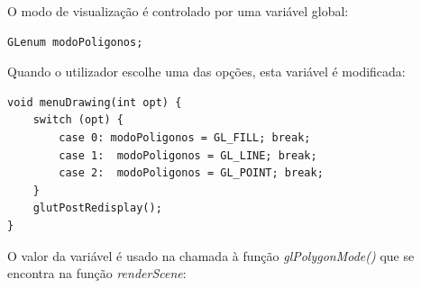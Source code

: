 O modo de visualização é controlado por uma variável global:

\begin{Verbatim}
GLenum modoPoligonos;
\end{Verbatim}

Quando o utilizador escolhe uma das opções, esta variável é modificada:

\begin{Verbatim}
void menuDrawing(int opt) {
	switch (opt) {
		case 0: modoPoligonos = GL_FILL; break;
		case 1:  modoPoligonos = GL_LINE; break;
		case 2:  modoPoligonos = GL_POINT; break;
	}
	glutPostRedisplay();
}
\end{Verbatim}

O valor da variável é usado na chamada à função \textit{glPolygonMode()} que se encontra na função \textit{renderScene}:









